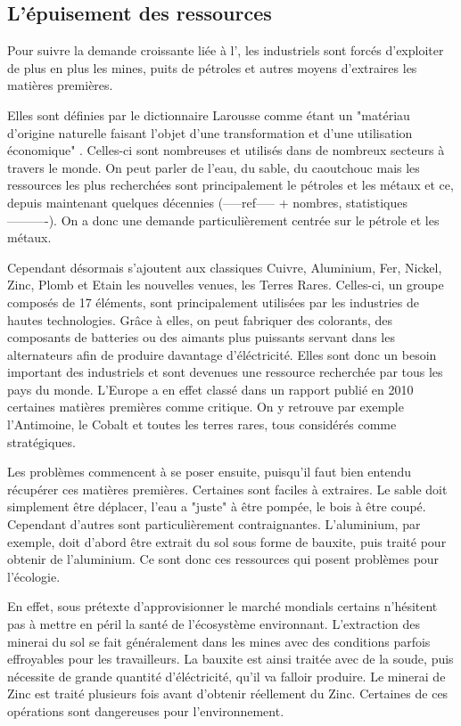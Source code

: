 \subsection{L’épuisement des ressources}

Pour suivre la demande croissante liée à l'\op, les industriels sont forcés d'exploiter de plus en plus les mines, puits de pétroles et autres moyens d'extraires les matières premières.

\smallbreak Elles sont définies par le dictionnaire Larousse comme étant un "matériau d'origine naturelle faisant l'objet d'une transformation et d'une utilisation économique" \cite{LarousseMatiere1eres}. Celles-ci sont nombreuses et utilisés dans de nombreux secteurs à travers le monde. On peut parler de l'eau, du sable, du caoutchouc mais les ressources les plus recherchées sont principalement le pétroles et les métaux et ce, depuis maintenant quelques décennies (-----ref----- + nombres, statistiques----------). On a donc une demande particulièrement centrée sur le pétrole et les métaux.

Cependant désormais s'ajoutent aux classiques Cuivre, Aluminium, Fer, Nickel, Zinc, Plomb et Etain les nouvelles venues, les Terres Rares. Celles-ci, un groupe composés de 17 éléments, sont principalement utilisées par les industries de hautes technologies. Grâce à elles, on peut fabriquer des colorants, des composants de batteries ou des aimants plus puissants servant dans les alternateurs afin de produire davantage d'éléctricité. Elles sont donc un besoin important des industriels et sont devenues une ressource recherchée par tous les pays du monde. L'Europe a en effet classé dans un rapport publié en 2010 \cite{RapportEuropeenTerresRares} certaines matières premières comme critique. On y retrouve par exemple l'Antimoine, le Cobalt et toutes les terres rares, tous considérés comme stratégiques.


\smallbreak Les problèmes commencent à se poser ensuite, puisqu'il faut bien entendu récupérer ces matières premières. Certaines sont faciles à extraires. Le sable doit simplement être déplacer, l'eau a "juste" à être pompée, le bois à être coupé. Cependant d'autres sont particulièrement contraignantes. L'aluminium, par exemple, doit d'abord être extrait du sol sous forme de bauxite, puis traité pour obtenir de l'aluminium. Ce sont donc ces ressources qui posent problèmes pour l'écologie.

En effet, sous prétexte d'approvisionner le marché mondials certains n'hésitent pas à mettre en péril la santé de l'écosystème environnant. L'extraction des minerai du sol se fait généralement dans les mines avec des conditions parfois effroyables pour les travailleurs. La bauxite est ainsi traitée avec de la soude, puis nécessite de grande quantité d'éléctricité, qu'il va falloir produire. Le minerai de Zinc est traité plusieurs fois avant d'obtenir réellement du Zinc. Certaines de ces opérations sont dangereuses pour l'environnement.

